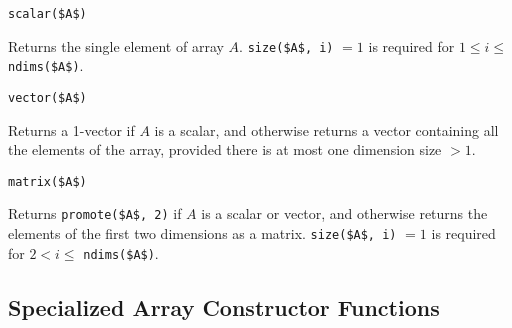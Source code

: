 \begin{operatordefinition}[scalar]
\begin{synopsis}\begin{lstlisting}
scalar($A$)
\end{lstlisting}\end{synopsis}
\begin{semantics}
Returns the single element of array $A$.  \lstinline!size($A$, i)! $= 1$ is required for $1 \leq i \leq$ \lstinline!ndims($A$)!.
\end{semantics}
\end{operatordefinition}

\begin{operatordefinition}[vector]
\begin{synopsis}\begin{lstlisting}
vector($A$)
\end{lstlisting}\end{synopsis}
\begin{semantics}
Returns a 1-vector if $A$ is a scalar, and otherwise returns a vector containing all the elements of the array, provided there is at most one dimension size $> 1$.
\end{semantics}
\end{operatordefinition}

\begin{operatordefinition}[matrix]
\begin{synopsis}\begin{lstlisting}
matrix($A$)
\end{lstlisting}\end{synopsis}
\begin{semantics}
Returns \lstinline!promote($A$, 2)! if $A$ is a scalar or vector, and otherwise returns the elements of the first two dimensions as a matrix.  \lstinline!size($A$, i)! $= 1$ is required for $2 < i \leq$ \lstinline!ndims($A$)!.
\end{semantics}
\end{operatordefinition}

\subsection{Specialized Array Constructor Functions}\label{specialized-array-constructor-functions}

